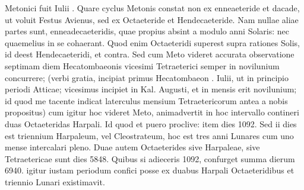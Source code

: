 Metonici fuit Iulii .
Quare cyclus Metonis constat
non ex enneaeteride et dacade, ut voluit Festus Avienus, sed ex Octaeteride
et Hendecaeteride.
Nam nullae aliae partes sunt, enneadecaeteridis,
quae propius absint a modulo anni Solaris: nec quaemelius
in se cohaerant.
Quod enim Octaeteridi superest supra rationes
Solis, id deest Hendecaeteridi, et contra.
Sed cum Meto videret
accurata observatione septimam diem Hecatombaeonis vicesimi
Tetraeterici semper in novilunium concurrere; (verbi gratia, incipiat
primus Hecatombaeon . Iulii, ut in principio periodi Atticae;
vicesimus incipiet in Kal. Augusti, et in  mensis erit novilunium;
id quod me tacente indicat laterculus mensium Tetraetericorum
antea a nobis propositus) cum igitur hoc videret Meto, animadvertit
in hoc intervallo contineri duas Octaeteridas Harpali.
Id
quod et puero proclive: item dies 1092.
Sed ii dies est triennium Harpaleum,
vel Cleostrateum, hoc est tres anni Lunares cum uno mense
intercalari pleno.
Duae autem Octaeterides sive Harpaleae, sive Tetraetericae
sunt dies 5848.
Quibus si adieceris 1092, confurget summa
dierum 6940.
igitur iustam periodum confici posse ex duabus
Harpali Octaeteridibus et triennio Lunari existimavit.

